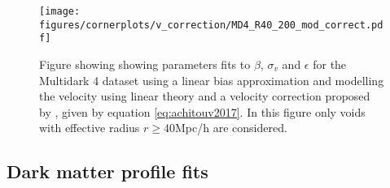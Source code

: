 \begin{figure}[H]
    \texttt{[image: figures/cornerplots/v\_correction/MD4\_R40\_200\_mod\_correct.pdf]}
    \caption{Figure showing showing parameters fits to $\beta$, $\sigma_v$ and $\epsilon$ for the Multidark 4 dataset using a linear bias approximation and modelling the velocity using linear theory and a velocity correction proposed by \cite{Achitouv_streaming}, given by equation \ref{eq:achitouv2017}. In this figure only voids with effective radius $r \geq 40$Mpc/h are considered.}
    \label{fig:linbiasMD4modR40}
\end{figure}

\subsection{Dark matter profile fits}
